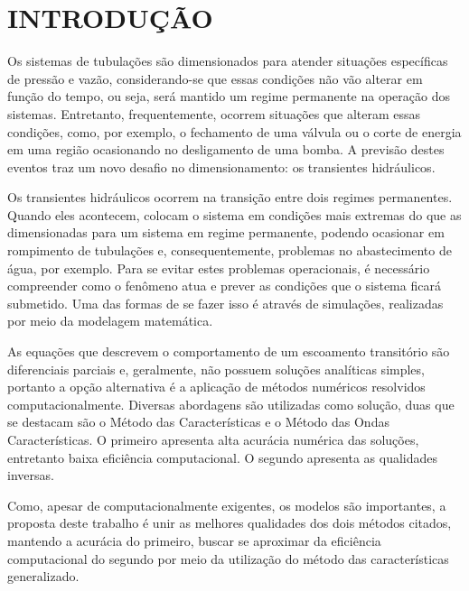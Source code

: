 	\section{INTRODUÇÃO}
	Os sistemas de tubulações são dimensionados para atender situações específicas de pressão e vazão, considerando-se que essas condições não vão alterar em função do tempo, ou seja, será mantido um regime permanente na operação dos sistemas. Entretanto, frequentemente, ocorrem situações que alteram essas condições, como, por exemplo, o fechamento de uma válvula ou o corte de energia em uma região ocasionando no desligamento de uma bomba. A previsão destes eventos traz um novo desafio no dimensionamento: os transientes hidráulicos.
	
	Os transientes hidráulicos ocorrem na transição entre dois regimes permanentes. Quando eles acontecem, colocam o sistema em condições mais extremas do que as dimensionadas para um sistema em regime permanente, podendo ocasionar em rompimento de tubulações e, consequentemente, problemas no abastecimento de água, por exemplo. Para se evitar estes problemas operacionais, é necessário compreender como o fenômeno atua e prever as condições que o sistema ficará submetido. Uma das formas de se fazer isso é através de simulações, realizadas por meio da modelagem matemática.
	
	As equações que descrevem o comportamento de um escoamento transitório são diferenciais parciais e, geralmente, não possuem soluções analíticas simples, portanto a opção alternativa é a aplicação de métodos numéricos resolvidos computacionalmente. Diversas abordagens são utilizadas como solução, duas que se destacam são o Método das Características e o Método das Ondas Características. O primeiro apresenta alta acurácia numérica das soluções, entretanto baixa eficiência computacional. O segundo apresenta as qualidades inversas.
	
	Como, apesar de computacionalmente exigentes, os modelos são importantes, a proposta deste trabalho é unir as melhores qualidades dos dois métodos citados, mantendo a acurácia do primeiro, buscar se aproximar da eficiência computacional do segundo por meio da utilização do método das características generalizado.
	
